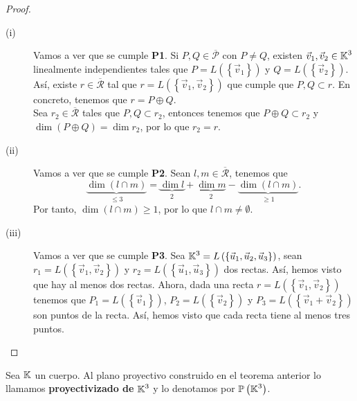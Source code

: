 \begin{proof}
\begin{description}
	\item[(i)] Vamos a ver que se cumple \textbf{P1}. Si $\displaystyle P,Q \in \overline{\mathcal{P}} $ con $\displaystyle P \neq Q $, existen $\displaystyle \vec{v}_{1}, \vec{v}_{2} \in \mathbb{K}^{3} $ linealmente independientes tales que $\displaystyle P = L\left( \left\{ \vec{v}_{1}\right\} \right) $ y $\displaystyle Q = L\left( \left\{ \vec{v}_{2}\right\} \right) $.
		Así, existe $\displaystyle r \in \overline{\mathcal{R}} $ tal que $\displaystyle r = L\left( \left\{ \vec{v}_{1}, \vec{v}_{2}\right\} \right) $ que cumple que $\displaystyle P, Q \subset r $. En concreto, tenemos que $\displaystyle r = P \oplus Q $. \\
	 Sea $\displaystyle r_{2} \in \overline{\mathcal{R}} $ tales que $\displaystyle P,Q \subset r_{2} $, entonces tenemos que $\displaystyle P \oplus Q \subset r_{2} $ y $\displaystyle \dim\left(P\oplus Q\right) = \dim r_{2} $, por lo que $\displaystyle r_{2} = r $.
\item[(ii)] Vamos a ver que se cumple \textbf{P2}. Sean $\displaystyle l,m \in \overline{\mathcal{R}} $, tenemos que 
	\[\underbrace{\dim\left(l \cap m\right)} _{\leq 3} = \underbrace{\dim l}_{2} + \underbrace{\dim m}_{2} - \underbrace{\dim\left(l \cap m\right)}_{\geq 1} .\]
	Por tanto, $\displaystyle \dim\left(l \cap m\right) \geq 1 $, por lo que $\displaystyle l \cap m \neq \emptyset $.
\item[(iii)] Vamos a ver que se cumple \textbf{P3}. Sea $\displaystyle \mathbb{K}^{3} = L\left( \left\{ \vec{u}_{1}, \vec{u}_{2}, \vec{u}_{3}\right\} \right) $, sean $\displaystyle r_{1} = L\left( \left\{ \vec{v}_{1}, \vec{v}_{2}\right\} \right) $ y $\displaystyle r_{2} = L\left( \left\{ \vec{u}_{1}, \vec{u}_{3}\right\} \right) $ dos rectas. Así, hemos visto que hay al menos dos rectas.
	Ahora, dada una recta $\displaystyle r = L(\left\{ \vec{v}_{1}, \vec{v}_{2}\right\} ) $ tenemos que $\displaystyle P_{1} = L\left( \left\{ \vec{v}_{1}\right\} \right) $, $\displaystyle P_{2} = L\left( \left\{ \vec{v}_{2}\right\} \right) $ y $\displaystyle P_{3} = L\left( \left\{ \vec{v}_{1} + \vec{v}_{2}\right\} \right) $ son puntos de la recta. Así, hemos visto que cada recta tiene al menos tres puntos.
\end{description}
\end{proof}
\begin{definition}
	Sea $\displaystyle \mathbb{K} $ un cuerpo. Al plano proyectivo construido en el teorema anterior lo llamamos \textbf{proyectivizado de} $\displaystyle \mathbb{K}^{3} $ y lo denotamos por $\displaystyle \mathbb{P}\left(\mathbb{K}^{3}\right) $.
\end{definition}
